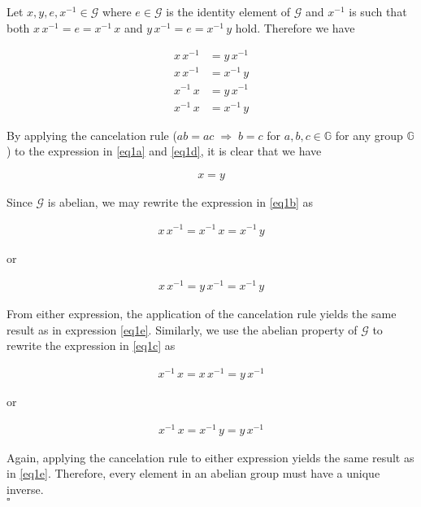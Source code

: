 \documentclass[../CryptoFinal.tex]{subfiles}
\begin{document}
\begin{flushleft}



 Let $x, y, e, x^{-1} \in \mathcal{G}$ where $e \in \mathcal{G}$ is the identity element of $\mathcal{G}$ and $x^{-1}$ is such that both $x \, x^{-1} = e = x^{-1} \, x$ and $y \, x^{-1} = e = x^{-1} \, y$ hold.  Therefore we have 

\begin{align}
  x \, x^{-1} &= y \, x^{-1} \label{eq1a} \\
  x \, x^{-1} &= x^{-1} \, y \label{eq1b} \\
  x^{-1} \, x &= y \, x^{-1} \label{eq1c} \\
  x^{-1} \, x &= x^{-1} \, y \label{eq1d} 
\end{align}

By applying the cancelation rule ($a b = a c \; \Rightarrow \; b = c$ for $a, b, c \in \mathbb{G}$ for any group $\mathbb{G}$) to the expression in \ref{eq1a} and \ref{eq1d}, it is clear that we have

\begin{align}
  x = y \label{eq1e}
\end{align}

Since $\mathcal{G}$ is abelian, we may rewrite the expression in \ref{eq1b} as

\begin{align*}
  x \, x^{-1} = x^{-1} \, x = x^{-1} \, y
\end{align*}

or

\begin{align*}
  x \, x^{-1} = y \, x^{-1} = x^{-1} \, y
\end{align*}

From either expression, the application of the cancelation rule yields the same result as in expression \ref{eq1e}.  Similarly, we use the abelian property of $\mathcal{G}$ to rewrite the expression in \ref{eq1c} as

\begin{align*}
  x^{-1} \, x = x \, x^{-1} = y \, x^{-1}
\end{align*}

or

\begin{align*}
  x^{-1} \, x = x^{-1} \, y = y \, x^{-1}
\end{align*}

Again, applying the cancelation rule to either expression yields the same result as in \ref{eq1e}.  Therefore, every element in an abelian group must have a unique inverse. \\
$\square$



\end{flushleft}
\end{document}
